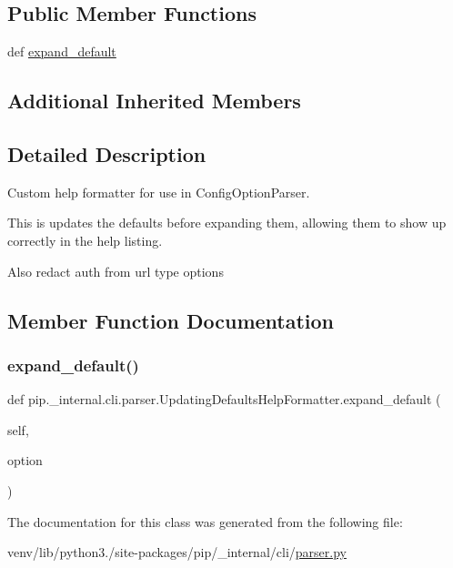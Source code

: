 \subsection*{Public Member Functions}
\begin{DoxyCompactItemize}
\item 
def \hyperlink{classpip_1_1__internal_1_1cli_1_1parser_1_1UpdatingDefaultsHelpFormatter_aaf44edb08c3093764267e845b70a5697}{expand\+\_\+default}
\end{DoxyCompactItemize}
\subsection*{Additional Inherited Members}


\subsection{Detailed Description}
\begin{DoxyVerb}Custom help formatter for use in ConfigOptionParser.

This is updates the defaults before expanding them, allowing
them to show up correctly in the help listing.

Also redact auth from url type options
\end{DoxyVerb}
 

\subsection{Member Function Documentation}
\mbox{\label{classpip_1_1__internal_1_1cli_1_1parser_1_1UpdatingDefaultsHelpFormatter_aaf44edb08c3093764267e845b70a5697}} 
\subsubsection{\texorpdfstring{expand\+\_\+default()}{expand\_default()}}
{\footnotesize\ttfamily def pip.\+\_\+internal.\+cli.\+parser.\+Updating\+Defaults\+Help\+Formatter.\+expand\+\_\+default (\begin{DoxyParamCaption}\item[{}]{self,  }\item[{}]{option }\end{DoxyParamCaption})}



The documentation for this class was generated from the following file\+:\begin{DoxyCompactItemize}
\item 
venv/lib/python3./site-\/packages/pip/\+\_\+internal/cli/\hyperlink{parser_8py}{parser.\+py}\end{DoxyCompactItemize}
